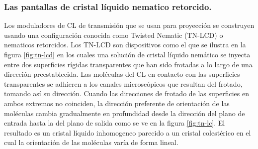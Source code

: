 \subsubsection{Las pantallas de cristal líquido nematico retorcido.}


Los moduladores de CL de transmisión que se usan para proyección se
construyen usando una configuración conocida como Twisted
Nematic (TN-LCD) o nematicos retorcidos. Los TN-LCD son
dispositivos como el que se ilustra en la figura \ref{fig:tn-lcd} en
los cuales una  solución de cristal líquido nemático 
se inyecta entre dos superficies rígidas transparentes que han sido frotadas
a lo largo de una dirección preestablecida. Las moléculas del CL en contacto con las
superficies transparentes se adhieren a los canales microscópicos que
resultan del frotado, tomando así su dirección. Cuando las direcciones
de frotado de las superficies en ambos extremos no coinciden, la
dirección preferente de orientación de las moléculas cambia
gradualmente en profundidad desde la dirección del plano de entrada hasta la del
plano de salida como se ve en la figura
\ref{fig:tn-lc}.  El resultado es un cristal líquido inhomogeneo
parecido a un cristal colestérico en el cual la orientación de las
moléculas varía de forma lineal.

